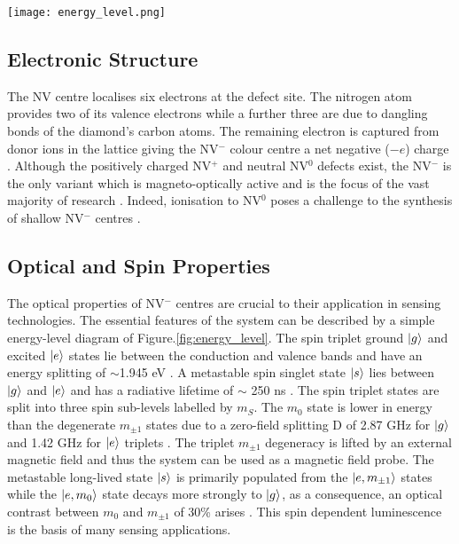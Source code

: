\documentclass[10pt]{article}
\newenvironment{Figure}
  {\par\medskip\noindent\minipage{\linewidth}}
  {\endminipage\par\medskip}
\begin{document}
\begin{multicols}{2}
\begin{Figure}
  \texttt{[image: energy\_level.png]}
  \label{fig:energy_level}
\end{Figure}

\subsection{Electronic Structure}
The NV centre localises six electrons at the defect site. The nitrogen atom provides two of its valence electrons while a further three are due to dangling bonds of the diamond's carbon atoms\cite{schirhagl2014nitrogen}. The remaining electron is captured from donor ions in the lattice giving the NV$^-$ colour centre a net negative ($-e$) charge \cite{schirhagl2014nitrogen}. Although the positively charged NV$^+$ and neutral NV$^0$ defects exist, the NV$^-$ is the only variant which is magneto-optically active and is the focus of the vast majority of research \cite{schirhagl2014nitrogen}. Indeed, ionisation to NV$^0$ poses a challenge to the synthesis of shallow NV$^-$ centres \cite{hauf2011chemical}. 




\subsection{Optical and Spin Properties}
The optical properties of NV$^-$ centres are crucial to their application in sensing technologies. The essential features of the system can be described by a simple energy-level diagram of Figure.\ref{fig:energy_level}. The spin triplet ground $\ket{g}$ and excited $\ket{e}$ states lie between the conduction and valence bands and have an energy splitting of $\sim$1.945 eV \cite{schirhagl2014nitrogen}. A metastable spin singlet state $\ket{s}$ lies between $\ket{g}$ and $\ket{e}$ and has a radiative lifetime of $\sim$ 250 ns \cite{schirhagl2014nitrogen}. The spin triplet states are split into three spin sub-levels labelled by $m_S$. The $m_0$ state is lower in energy than the degenerate $m_{\pm1}$ states due to a zero-field splitting D of 2.87 GHz for $\ket{g}$ and 1.42 GHz for $\ket{e}$ triplets \cite{doherty2013nitrogen}. The triplet $m_{\pm1}$ degeneracy is lifted by an external magnetic field and thus the system can be used as a magnetic field probe. The metastable long-lived state $\ket{s}$ is primarily populated from the $\ket{e,m_{\pm1}}$ states while the $\ket{e,m_0}$ state decays more strongly to $\ket{g}$, as a consequence, an optical contrast between $m_0$ and $m_{\pm1}$ of 30\% arises \cite{schirhagl2014nitrogen}. This spin dependent luminescence is the basis of many sensing applications. 


\end{multicols}
\end{document}
